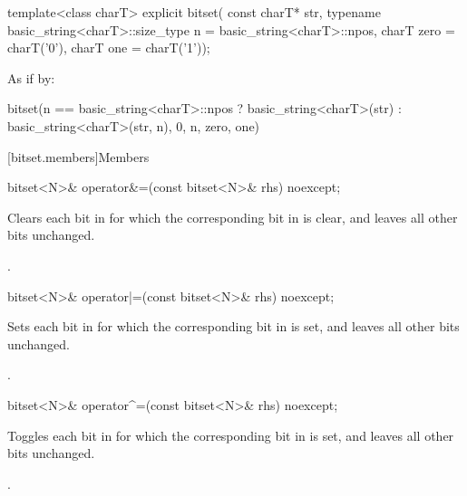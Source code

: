 %
\begin{itemdecl}
template<class charT>
  explicit bitset(
    const charT* str,
    typename basic_string<charT>::size_type n = basic_string<charT>::npos,
    charT zero = charT('0'),
    charT one = charT('1'));
\end{itemdecl}

\begin{itemdescr}
\pnum
\effects
As if by:
\begin{codeblock}
bitset(n == basic_string<charT>::npos
          ? basic_string<charT>(str)
          : basic_string<charT>(str, n),
       0, n, zero, one)
\end{codeblock}
\end{itemdescr}


[bitset.members]{Members}

%
\begin{itemdecl}
bitset<N>& operator&=(const bitset<N>& rhs) noexcept;
\end{itemdecl}

\begin{itemdescr}
\pnum
\effects
Clears each bit in
for which the corresponding bit in  is clear, and leaves all other bits unchanged.

\pnum
\returns
{}.
\end{itemdescr}

\begin{indexed}{}
\begin{itemdecl}
bitset<N>& operator|=(const bitset<N>& rhs) noexcept;
\end{itemdecl}
\end{indexed}

\begin{itemdescr}
\pnum
\effects
Sets each bit in
for which the corresponding bit in  is set, and leaves all other bits unchanged.

\pnum
\returns
{}.
\end{itemdescr}

%
\begin{itemdecl}
bitset<N>& operator^=(const bitset<N>& rhs) noexcept;
\end{itemdecl}

\begin{itemdescr}
\pnum
\effects
Toggles each bit in
for which the corresponding bit in  is set, and leaves all other bits unchanged.

\pnum
\returns
{}.
\end{itemdescr}

